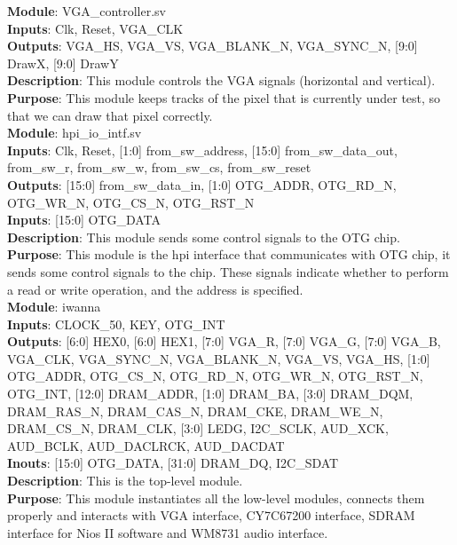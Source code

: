 \documentclass[12pt]{article}
\begin{document}
\textbf{Module}: VGA\_controller.sv \\ 
\textbf{Inputs}: Clk, Reset, VGA\_CLK \\ 
\textbf{Outputs}: VGA\_HS, VGA\_VS, VGA\_BLANK\_N, VGA\_SYNC\_N, [9:0] DrawX, [9:0] DrawY \\
\textbf{Description}: This module controls the VGA signals (horizontal and vertical). \\ 
\textbf{Purpose}: This module keeps tracks of the pixel that is currently under test, so that we can draw that pixel correctly. \\

\textbf{Module}: hpi\_io\_intf.sv \\ 
\textbf{Inputs}: Clk, Reset, [1:0] from\_sw\_address, [15:0] from\_sw\_data\_out, from\_sw\_r, from\_sw\_w, from\_sw\_cs, from\_sw\_reset \\ 
\textbf{Outputs}: [15:0] from\_sw\_data\_in, [1:0] OTG\_ADDR, OTG\_RD\_N, OTG\_WR\_N, OTG\_CS\_N, OTG\_RST\_N \\
\textbf{Inputs}: [15:0] OTG\_DATA \\
\textbf{Description}: This module sends some control signals to the OTG chip. \\ 
\textbf{Purpose}: This module is the hpi interface that communicates with OTG chip, it sends some control signals to the chip. These signals indicate whether to perform a read or write operation, and the address is specified. \\

\textbf{Module}: iwanna \\ 
\textbf{Inputs}: CLOCK\_50, KEY, OTG\_INT \\ 
\textbf{Outputs}: [6:0] HEX0, [6:0] HEX1, [7:0] VGA\_R, [7:0] VGA\_G, [7:0] VGA\_B, VGA\_CLK, VGA\_SYNC\_N, VGA\_BLANK\_N, VGA\_VS, VGA\_HS, [1:0] OTG\_ADDR, OTG\_CS\_N, OTG\_RD\_N, OTG\_WR\_N, OTG\_RST\_N, OTG\_INT, [12:0] DRAM\_ADDR, [1:0] DRAM\_BA, [3:0] DRAM\_DQM, DRAM\_RAS\_N, DRAM\_CAS\_N, DRAM\_CKE, DRAM\_WE\_N, DRAM\_CS\_N, DRAM\_CLK, [3:0] LEDG, I2C\_SCLK, AUD\_XCK, AUD\_BCLK, AUD\_DACLRCK, AUD\_DACDAT \\
\textbf{Inouts}: [15:0] OTG\_DATA, [31:0] DRAM\_DQ, I2C\_SDAT \\
\textbf{Description}: This is the top-level module. \\ 
\textbf{Purpose}: This module instantiates all the low-level modules, connects them properly and interacts with VGA interface, CY7C67200 interface, SDRAM interface for Nios II software and WM8731 audio interface. \\
\end{document}
